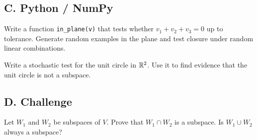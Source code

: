 \subsection*{C. Python / NumPy}

\begin{exercise}
Write a function \texttt{in\_plane(v)} that tests whether
$v_1+v_2+v_3=0$ up to tolerance. Generate random examples in the plane and
test closure under random linear combinations.
\end{exercise}

\begin{exercise}
Write a stochastic test for the unit circle in $\mathbb{R}^2$. Use it to find evidence
that the unit circle is not a subspace.
\end{exercise}

\subsection*{D. Challenge}

\begin{exercise}
Let $W_1$ and $W_2$ be subspaces of $V$. Prove that $W_1\cap W_2$ is a
subspace. Is $W_1\cup W_2$ always a subspace?
\end{exercise}

